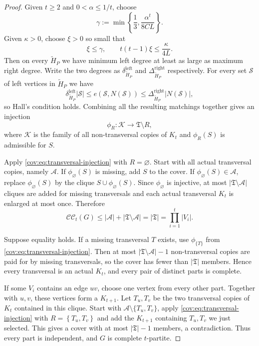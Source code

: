 \documentclass[10pt,a4paper]{amsart}
\newcommand{\CC}{\mathcal{CC}}
\begin{document}
\begin{proof}
Given \(t\ge 2\) and \(0<\alpha\le 1/t\), choose
\begin{equation*}
\gamma:=\min\left\{\frac13,\frac{\alpha^t}{8CL}\right\}.
\end{equation*}
Given \(\kappa>0\), choose \(\xi>0\) so small that
\begin{equation*}
\xi\le\gamma,
\qquad
t(t-1)\xi\le\frac{\kappa}{4L}.
\end{equation*}
Then on every \(\widetilde{H}_P\) we have minimum left degree at least as large as maximum right degree.
Write the two degrees as \(\delta_{\widetilde{H}_P}^{\mathrm{left}}\) and \(\Delta_{\widetilde{H}_P}^{\mathrm{right}}\) respectively.
For every set \(\mathcal S\) of left vertices in \(\widetilde{H}_P\) we have
\begin{equation*}
\delta_{\widetilde{H}_P}^{\mathrm{left}}|\mathcal S|
 \le e(\mathcal S,N(\mathcal S))
 \le \Delta_{\widetilde{H}_P}^{\mathrm{right}}|N(\mathcal S)|,
\end{equation*}
so Hall's condition holds. Combining all the resulting matchings together gives an injection
\begin{equation}\label{cov:eq:transversal-injection}
\phi_R:\mathcal K\longrightarrow\mathfrak T\setminus R,
\end{equation}
where \(\mathcal K\) is the family of all non-transversal copies of \(K_t\) and \(\phi_R(S)\) is admissible for \(S\).

Apply \eqref{cov:eq:transversal-injection} with \(R=\varnothing\).
Start with all actual transversal copies, namely \(\mathcal A\). If \(\phi_\varnothing(S)\) is missing,
add \(S\) to the cover. If \(\phi_\varnothing(S)\in\mathcal A\), replace \(\phi_\varnothing(S)\) by
the clique \(S\cup\phi_\varnothing(S)\). Since \(\phi_\varnothing\) is injective,
at most \(|\mathfrak T\setminus\mathcal A|\) cliques are added for missing transversals and
each actual transversal \(K_t\) is enlarged at most once. Therefore
\begin{equation*}
\CC_t(G)\le |\mathcal A|+|\mathfrak T\setminus\mathcal A|
 =|\mathfrak T|=\prod_{i=1}^t|V_i|.
\end{equation*}

Suppose equality holds. If a missing transversal \(T\) exists, use \(\phi_{\{T\}}\)
from \eqref{cov:eq:transversal-injection}. Then at most \(|\mathfrak T\setminus\mathcal A|-1\)
non-transversal copies are paid for by missing transversals, so the cover has fewer than \(|\mathfrak T|\) members.
Hence every transversal is an actual \(K_t\), and every pair of distinct parts is complete.

If some \(V_i\) contains an edge \(uv\), choose one vertex from every other part. Together with \(u,v\),
these vertices form a \(K_{t+1}\). Let \(T_u,T_v\) be the two transversal copies of \(K_t\) contained in this clique.
Start with \(\mathcal A\setminus\{T_u,T_v\}\), apply \eqref{cov:eq:transversal-injection} with
\(R=\left\{T_u,T_v\right\}\) and add the \(K_{t+1}\) containing \(T_u,T_v\) we just selected.
This gives a cover with at most \(|\mathfrak T|-1\) members, a contradiction.
Thus every part is independent, and \(G\) is complete \(t\)-partite.
\end{proof}
\end{document}

